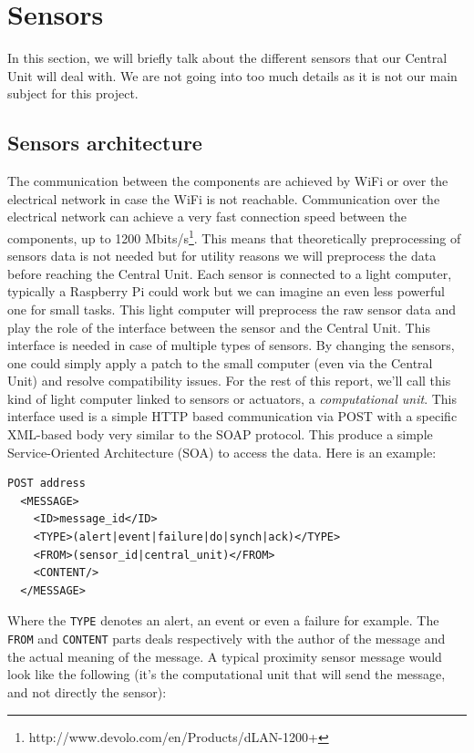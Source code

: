 \documentclass{acm_proc_article-sp}
\begin{document}
\section{Sensors}\label{sensors_section}
In this section, we will briefly talk about the different sensors that our Central Unit will deal with. 
We are not going into too much details as it is not our main subject for this project.
\subsection{Sensors architecture}
The communication between the components are achieved by WiFi or over the electrical network in case the WiFi is not reachable. 
Communication over the electrical network can achieve a very fast connection speed between the components, up to 1200 Mbits/s\footnote{http://www.devolo.com/en/Products/dLAN-1200+}. 
This means that theoretically preprocessing of sensors data is not needed but for utility reasons we will preprocess the data before reaching the Central Unit.
Each sensor is connected to a light computer, typically a Raspberry Pi could work but we can imagine an even less powerful one for small tasks. 
This light computer will preprocess the raw sensor data and play the role of the interface between the sensor and the Central Unit. 
This interface is needed in case of multiple types of sensors. By changing the sensors, one could simply apply a patch to the small computer (even via the Central Unit) and resolve compatibility issues. For the rest of this report, we'll call this kind of light computer linked to sensors or actuators, a \textit{computational unit}.
This interface used is a simple HTTP based communication via POST with a specific XML-based body very similar to the SOAP protocol. 
This produce a simple Service-Oriented Architecture (SOA) to access the data. 
Here is an example:

\begin{minipage}{\linewidth}
\begin{lstlisting}
POST address 
  <MESSAGE>
    <ID>message_id</ID>
    <TYPE>(alert|event|failure|do|synch|ack)</TYPE>
    <FROM>(sensor_id|central_unit)</FROM>
    <CONTENT/>
  </MESSAGE>
\end{lstlisting}
\end{minipage}

Where the \texttt{TYPE} denotes an alert, an event or even a failure for example. 
The \texttt{FROM} and \texttt{CONTENT} parts deals respectively with the author of the message and the actual meaning of the message. 
A typical proximity sensor message would look like the following (it's the computational unit that will send the message, and not directly the sensor):
\end{document}
